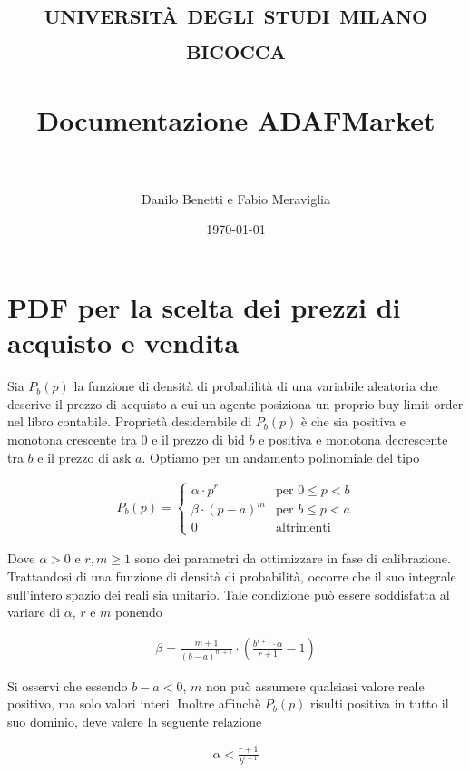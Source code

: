 \documentclass[paper=a4, fontsize=11pt]{scrartcl}
\title{	
\normalfont \normalsize 
\textsc{università degli studi milano bicocca} \\ [25pt]
\horrule{0.5pt} \\ [0.4cm]
\huge Documentazione ADAFMarket \\
\horrule{2pt} \\ [0.5cm]
}
\author{Danilo Benetti e Fabio Meraviglia} %
\date{\normalsize\today} %
\numberwithin{equation}{section}
\numberwithin{figure}{section}
\numberwithin{table}{section}
\begin{document}
\maketitle %


\section{PDF per la scelta dei prezzi di acquisto e vendita}

Sia $P_b(p)$ la funzione di densità di probabilità di una variabile aleatoria che descrive il prezzo di acquisto a cui un agente posiziona un proprio buy limit order nel libro contabile. Proprietà desiderabile di $P_b(p)$ è che sia positiva e monotona crescente tra $0$ e il prezzo di bid $b$ e positiva e monotona decrescente tra $b$ e il prezzo di ask $a$. Optiamo per un andamento polinomiale del tipo

\begin{align}
P_b(p) = \left\{\begin{array}{ll}
         \alpha \cdot p^r     & \text{per } 0 \leq p < b \\
         \beta  \cdot (p-a)^m & \text{per } b \leq p < a \\
         0                    & \text{altrimenti } \end{array}\right.
\end{align}

Dove $\alpha > 0$ e $r, m \geq 1$ sono dei parametri da ottimizzare in fase di calibrazione. Trattandosi di una funzione di densità di probabilità, occorre che il suo integrale sull'intero spazio dei reali sia unitario. Tale condizione può essere soddisfatta al variare di $\alpha$, $r$ e $m$ ponendo

\begin{align}
\beta = \frac{m+1}{(b-a)^{m+1}} \cdot \left(\frac{b^{r+1}\cdot\alpha}{r+1}-1\right)
\end{align}

Si osservi che essendo $b - a < 0$, $m$ non può assumere qualsiasi valore reale positivo, ma solo valori interi. Inoltre affinchè $P_b(p)$ risulti positiva in tutto il suo dominio, deve valere la seguente relazione

\begin{align}
\alpha < \frac{r+1}{b^{r+1}}
\end{align}
\end{document}
